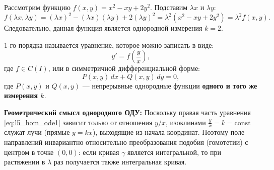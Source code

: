 \begin{example}
    Рассмотрим функцию $f(x, y) = x^2 - x y + 2 y^2$. Подставим $\lambda x$ и
    $\lambda y$:
    \[
        f(\lambda x, \lambda y) = (\lambda x)^2 - (\lambda x)(\lambda y) +
        2(\lambda y)^2 = \lambda^2 \left(x^2 - x y + 2 y^2\right) =
        \lambda^2 f(x, y).
    \]
    Следовательно, данная функция является однородной измерения $k = 2$.
\end{example}

\begin{definition}
     1-го порядка называется
    уравнение, которое можно записать в виде:
    \begin{equation} \label{eq:l5_hom_ode1}
        y' = f\left(\frac{y}{x}\right), \tag{2}
    \end{equation}
    где $f \in C(I)$, или в симметричной дифференциальной форме:
    \begin{equation} \label{eq:l5_hom_ode2}
        P(x, y) \, dx + Q(x, y) \, dy = 0, \tag{3}
    \end{equation}
    где $P(x, y)$ и $Q(x, y)$ — непрерывные однородные функции \textbf{одного
    и того же измерения $k$}.
\end{definition}

\textbf{Геометрический смысл однородного ОДУ:}
Поскольку правая часть уравнения \eqref{eq:l5_hom_ode1} зависит только от
отношения $y/x$, изоклинами $\frac{y}{x} = k = \text{const}$ служат лучи
(прямые $y = k x$), выходящие из начала координат. Поэтому поле направлений
инвариантно относительно преобразования подобия (гомотетии) с центром в точке
$(0, 0)$: если кривая $\gamma$ является интегральной, то при растяжении в
$\lambda$ раз получается также интегральная кривая.

